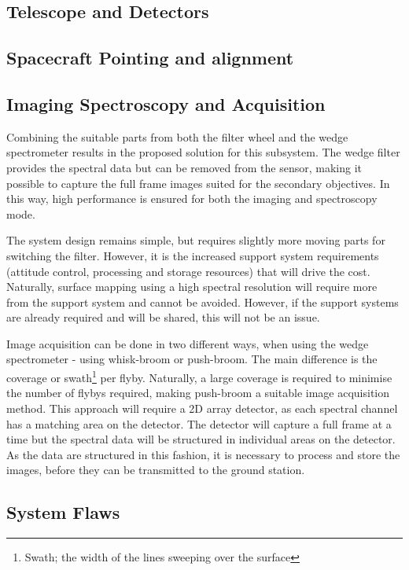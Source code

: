 \subsection{Telescope and Detectors}
\subsection{Spacecraft Pointing and alignment}
\subsection{Imaging Spectroscopy and Acquisition}
Combining the suitable parts from both the filter wheel and the wedge spectrometer results in the proposed solution for this subsystem. The wedge filter provides the spectral data but can be removed from the sensor, making it possible to capture the full frame images suited for the secondary objectives. In this way, high performance is ensured for both the imaging and spectroscopy mode. 

The system design remains simple, but requires slightly more moving parts for switching the filter. However, it is the increased support system requirements (attitude control, processing and storage resources) that will drive the cost. Naturally, surface mapping using a high spectral resolution will require more from the support system and cannot be avoided. However, if the support systems are already required and will be shared, this will not be an issue.

Image acquisition can be done in two different ways, when using the wedge spectrometer - using whisk-broom or push-broom. The main difference is the coverage or swath\footnote{Swath; the width of the lines sweeping over the surface} per flyby. Naturally, a large coverage is required to minimise the number of flybys required, making push-broom a suitable image acquisition method. This approach will require a 2D
array detector, as each spectral channel has a matching area on the detector. The detector will capture a full frame at a time but the spectral data will be structured in individual areas on the detector. As the data are structured in this fashion, it is necessary to process and store the images, before they can be transmitted to the ground station.
\subsection{System Flaws}

